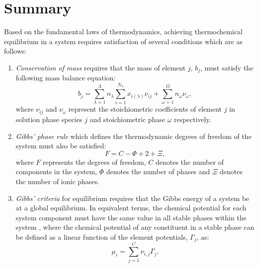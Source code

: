 \section{Summary}
Based on the fundamental laws of thermodynamics, achieving thermochemical equilibrium in a system requires satisfaction of several conditions which are as follows:
    	\begin{enumerate}\compresslist
        		\item \emph{Conservation of mass} requires that the mass of element $j$, $b_j$, must satisfy the following mass balance equation:
            	\begin{equation*}
                		b_j = \sum_{\lambda=1}^{\Lambda} n_{\lambda}\sum_{i=1}^{N_{\lambda}}x_{i({\lambda})}{\nu}_{ij} +  \sum_{\omega=1}^{\Omega} n_{\omega}{\nu}_{\omega},
            	\end{equation*}
            	where ${\nu}_{ij}$ and ${\nu}_{\omega}$ represent the stoichiometric coefficients of element $j$ in solution phase species $j$ and stoichiometric phase $\omega$ respectively.
        		\item \emph{Gibbs' phase rule} which defines the thermodynamic degrees of freedom of the system must also be     satisfied:
            	\begin{equation*}
                		F=C-\Phi + 2 + \Xi,
            	\end{equation*}
            	where $F$ represents the degrees of freedom, $C$ denotes the number of components in the system, $\Phi$ denotes the number of phases and $\Xi$ denotes the number of ionic phases.
        		\item \emph{Gibbs' criteria} for equilibrium requires that the Gibbs energy of a system be at a global equilibrium. In equivalent terms, the chemical potential for each system component must have the same value in all stable phases within the system \cite{HILLERT198131}, where the chemical potential of any constituent in a stable phase can be defined as a linear function of the element potentials, $\Gamma_j$, as:
            	\begin{equation*}
		        \mu_{i} = \sum_{j=1}^C \nu_{i,j} \Gamma_j.
            	\end{equation*}
    	\end{enumerate}

